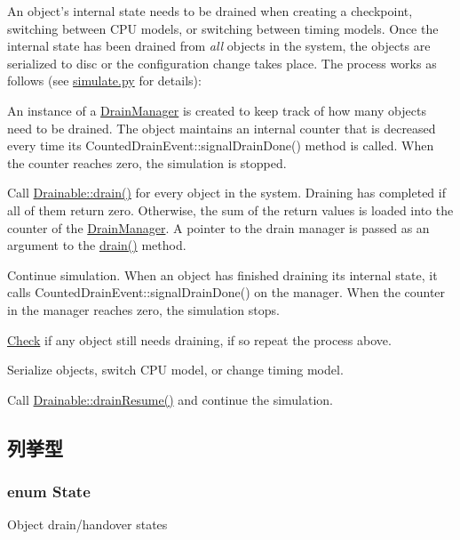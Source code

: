 An object's internal state needs to be drained when creating a checkpoint, switching between CPU models, or switching between timing models. Once the internal state has been drained from {\itshape all\/} objects in the system, the objects are serialized to disc or the configuration change takes place. The process works as follows (see \hyperlink{simulate_8py}{simulate.py} for details):


\begin{DoxyEnumerate}
\item An instance of a \hyperlink{classDrainManager}{DrainManager} is created to keep track of how many objects need to be drained. The object maintains an internal counter that is decreased every time its CountedDrainEvent::signalDrainDone() method is called. When the counter reaches zero, the simulation is stopped.


\item Call \hyperlink{classDrainable_a1ed42c14f2f622ea6b0df3865e89c8b4}{Drainable::drain()} for every object in the system. Draining has completed if all of them return zero. Otherwise, the sum of the return values is loaded into the counter of the \hyperlink{classDrainManager}{DrainManager}. A pointer to the drain manager is passed as an argument to the \hyperlink{classDrainable_a1ed42c14f2f622ea6b0df3865e89c8b4}{drain()} method.


\item Continue simulation. When an object has finished draining its internal state, it calls CountedDrainEvent::signalDrainDone() on the manager. When the counter in the manager reaches zero, the simulation stops.


\item \hyperlink{classCheck}{Check} if any object still needs draining, if so repeat the process above.


\item Serialize objects, switch CPU model, or change timing model.


\item Call \hyperlink{classDrainable_a8f020d3237536fe007fc488c4125c5d8}{Drainable::drainResume()} and continue the simulation. 
\end{DoxyEnumerate}

\subsection{列挙型}
\hypertarget{classDrainable_a5d74787dedbc4e11c1ab15bf487e61f8}{
\subsubsection[{State}]{\setlength{\rightskip}{0pt plus 5cm}enum {\bf State}}}
\label{classDrainable_a5d74787dedbc4e11c1ab15bf487e61f8}
Object drain/handover states

